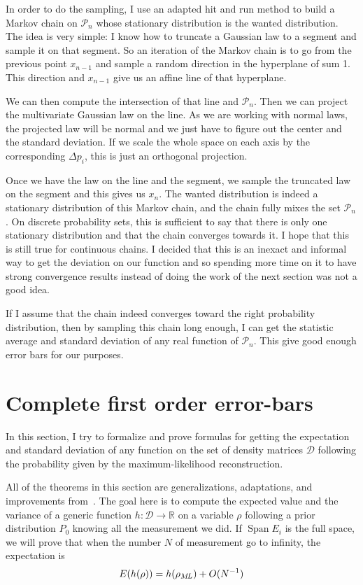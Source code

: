\documentclass[10pt,a4paper]{report}
\theoremstyle{plain}
\theoremstyle{definition}
\theoremstyle{remark}
\newcommand{\R}{\ensuremath{\mathbb{R}}}
\DeclareMathOperator{\Span}{Span}
\newcommand{\ml}{_{M\!L}}
\begin{document}
In order to do the sampling, I use an adapted hit and run method to build a
Markov chain on $\mathcal{P}_n$ whose stationary
distribution is the wanted distribution. The idea is very simple: I know how to
truncate a Gaussian law to a segment and sample it on that segment. So an
iteration of the Markov chain is to go from the previous point $x_{n-1}$ and
sample a random direction in the hyperplane of sum 1. This direction and
$x_{n-1}$ give us an affine line of that hyperplane.

We can then compute the
intersection of that line and $\mathcal{P}_n$. Then we can project the
multivariate Gaussian law on the line. As we are working with normal laws, the
projected law will be normal and we just have to figure out the center and the
standard deviation. If we scale the whole space on each axis by the
corresponding $\Delta p_i$, this is just an orthogonal projection.

Once we have the law on the line and the segment, we sample the truncated law on
the segment and this gives us $x_n$. The wanted distribution is indeed a
stationary distribution of this Markov chain, and the chain fully mixes the set
$\mathcal{P}_n$. On discrete probability sets, this is sufficient to say that there
is only one stationary distribution and that the chain converges towards it. I
hope that this is still true for continuous chains. I decided that this is an inexact
and informal way to get the deviation on our function and so spending more time
on it to have strong convergence results
instead of doing the work of the next section was not a good idea.

If I assume that the chain indeed converges toward the right probability
distribution, then by sampling this chain long enough, I
can get the statistic average and standard deviation of any real function of
$\mathcal{P}_n$. This give good enough error bars for our purposes.

\section{Complete first order error-bars}\label{sec:errbar}

In this section, I try to formalize and prove formulas for getting the
expectation and standard deviation of any function on the set of density
matrices $\mathcal{D}$ following the probability given by the maximum-likelihood
reconstruction.

All of the theorems in this section are generalizations,
adaptations, and improvements from~\cite{SPRAL17}. The goal here is to compute
the expected value and the variance of a generic function $h : \mathcal{D} \to
\R$ on a variable $\rho$ following a prior distribution $P_0$
knowing all the measurement
we did. If $\Span E_i$ is the full space,
we will prove that when the number $N$ of measurement go to infinity, the
expectation is
\[E(h(\rho)) = h(\rho\ml) + O(N\inv)\]
\end{document}
